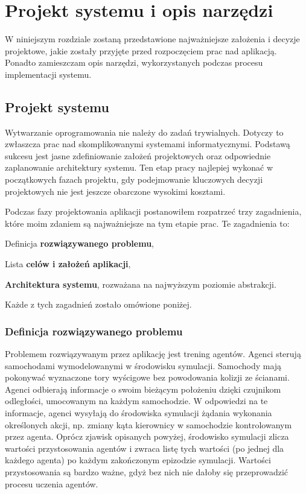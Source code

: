 \chapter{Projekt systemu i opis narzędzi}
\label{DesignSystemChapter}
W niniejszym rozdziale zostaną przedstawione najważniejsze założenia i decyzje projektowe, jakie zostały przyjęte przed rozpoczęciem prac nad aplikacją. Ponadto zamieszczam opis narzędzi, wykorzystanych podczas procesu implementacji systemu.

\section{Projekt systemu}
Wytwarzanie oprogramowania nie należy do zadań trywialnych. Dotyczy to zwłaszcza prac nad skomplikowanymi systemami informatycznymi. Podstawą sukcesu jest jasne zdefiniowanie założeń projektowych oraz odpowiednie zaplanowanie architektury systemu. Ten etap pracy najlepiej wykonać w początkowych fazach projektu, gdy podejmowanie kluczowych decyzji projektowych nie jest jeszcze obarczone wysokimi kosztami.

Podczas fazy projektowania aplikacji postanowiłem rozpatrzeć trzy zagadnienia, które moim zdaniem są najważniejsze na tym etapie prac. Te zagadnienia to:
\begin{enumerate*}
\item Definicja \textbf{rozwiązywanego problemu},
\item Lista \textbf{celów i założeń aplikacji},
\item \textbf{Architektura systemu}, rozważana na najwyższym poziomie abstrakcji.
\end{enumerate*}

Każde z tych zagadnień zostało omówione poniżej.

\subsection{Definicja rozwiązywanego problemu}
Problemem rozwiązywanym przez aplikację jest trening agentów. Agenci sterują samochodami wymodelowanymi w środowisku symulacji. Samochody mają pokonywać wyznaczone tory wyścigowe bez powodowania kolizji ze ścianami. Agenci odbierają informacje o swoim bieżącym położeniu dzięki czujnikom odległości, umocowanym na każdym samochodzie. W odpowiedzi na te informacje, agenci wysyłają do środowiska symulacji żądania wykonania określonych akcji, np. zmiany kąta kierownicy w samochodzie kontrolowanym przez agenta. Oprócz zjawisk opisanych powyżej, środowisko symulacji zlicza wartości przystosowania agentów i zwraca listę tych wartości (po jednej dla każdego agenta) po każdym zakończonym epizodzie symulacji. Wartości przystosowania są bardzo ważne, gdyż bez nich nie dałoby się przeprowadzić procesu uczenia agentów.

